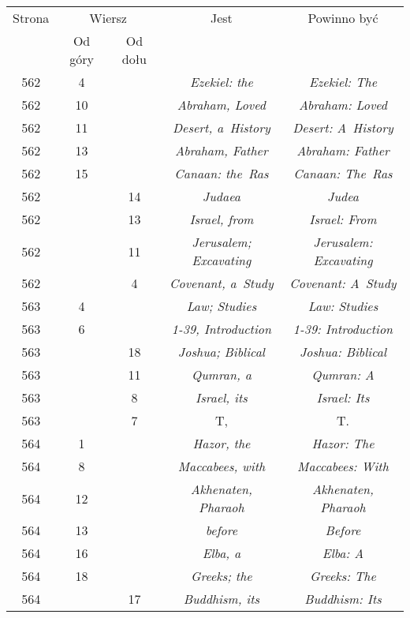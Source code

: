 \documentclass[a4paper,11pt]{article}
\begin{document}
\begin{center}
  \begin{tabular}{|c|c|c|c|c|}
    \hline
    Strona & \multicolumn{2}{c|}{Wiersz} & Jest
                              & Powinno być \\ \cline{2-3}
    & Od góry & Od dołu & & \\
    \hline
    562 & \hphantom{0}4 & & \textit{Ezekiel: the} & \textit{Ezekiel: The} \\
    562 & 10 & & \textit{Abraham, Loved} & \textit{Abraham: Loved} \\
    562 & 11 & & \textit{Desert, a~History} & \textit{Desert: A~History} \\
    562 & 13 & & \textit{Abraham, Father} & \textit{Abraham: Father} \\
    562 & 15 & & \textit{Canaan: the~Ras} & \textit{Canaan: The~Ras} \\
    562 & & 14 & \textit{Judaea} & \textit{Judea} \\
    562 & & 13 & \textit{Israel, from} & \textit{Israel: From} \\
    562 & & 11 & \textit{Jerusalem; Excavating}
           & \textit{Jerusalem: Excavating} \\
    562 & &  4 & \textit{Covenant, a~Study} & \textit{Covenant: A~Study} \\
    563 &  4 & & \textit{Law; Studies} & \textit{Law: Studies} \\
    563 &  6 & & \textit{1-39, Introduction}
           & \textit{1-39: Introduction} \\
    563 & & 18 & \textit{Joshua; Biblical} & \textit{Joshua: Biblical} \\
    563 & & 11 & \textit{Qumran, a} & \textit{Qumran: A} \\
    563 & &  8 & \textit{Israel, its} & \textit{Israel: Its} \\
    563 & &  7 & T, & T. \\
    564 &  1 & & \textit{Hazor, the} & \textit{Hazor: The} \\
    564 &  8 & & \textit{Maccabees, with} & \textit{Maccabees: With} \\
    564 & 12 & & \textit{Akhenaten, Pharaoh}
           & \textit{Akhenaten, Pharaoh} \\
    564 & 13 & & \textit{before} & \textit{Before} \\
    564 & 16 & & \textit{Elba, a} & \textit{Elba: A} \\
    564 & 18 & & \textit{Greeks; the} & \textit{Greeks: The} \\
    564 & & 17 & \textit{Buddhism, its} & \textit{Buddhism: Its} \\

\end{tabular}
\end{center}
\end{document}
